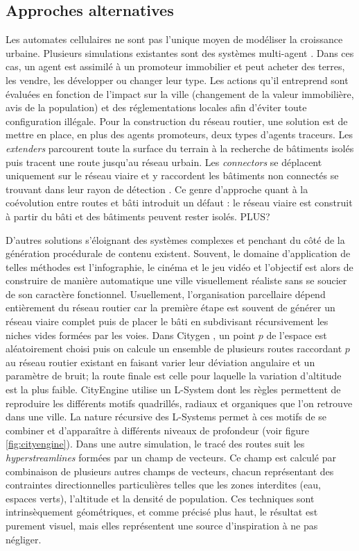 \documentclass[12pt]{article}
\begin{document}
\subsection{Approches alternatives}

Les automates cellulaires ne sont pas l'unique moyen de modéliser la
croissance urbaine. Plusieurs simulations existantes sont des systèmes
multi-agent \cite{Lechner2003,Lechner2004}. Dans ces cas, un agent est
assimilé à un promoteur immobilier et peut acheter des terres, les
vendre, les développer ou changer leur type. Les actions qu'il
entreprend sont évaluées en fonction de l'impact sur la ville
(changement de la valeur immobilière, avis de la population) et des
réglementations locales afin d'éviter toute configuration illégale.
Pour la construction du réseau routier, une solution est de mettre en
place, en plus des agents promoteurs, deux types d'agents
traceurs. Les \textit{extenders} parcourent toute la surface du
terrain à la recherche de bâtiments isolés puis tracent une route
jusqu'au réseau urbain. Les \textit{connectors} se déplacent
uniquement sur le réseau viaire et y raccordent les bâtiments non
connectés se trouvant dans leur rayon de détection
\cite{Lechner2003}. Ce genre d'approche quant à la coévolution entre
routes et bâti introduit un défaut : le réseau viaire est construit à
partir du bâti et des bâtiments peuvent rester isolés. PLUS?

D'autres solutions s'éloignant des systèmes complexes et penchant du
côté de la génération procédurale de contenu existent. Souvent, le
domaine d'application de telles méthodes est l'infographie, le cinéma
et le jeu vidéo et l'objectif est alors de construire de manière
automatique une ville visuellement réaliste sans se soucier de son
caractère fonctionnel. Usuellement, l'organisation parcellaire dépend
entièrement du réseau routier car la première étape est souvent de
générer un réseau viaire complet puis de placer le bâti en subdivisant
récursivement les niches vides formées par les voies. Dans Citygen
\cite{Kelly2006b}, un point $p$ de l'espace est aléatoirement choisi
puis on calcule un ensemble de plusieurs routes raccordant $p$ au
réseau routier existant en faisant varier leur déviation angulaire et
un paramètre de bruit; la route finale est celle pour laquelle la
variation d'altitude est la plus faible. CityEngine \cite{Parish2001}
utilise un L-System dont les règles permettent de reproduire les
différents motifs quadrillés, radiaux et organiques que l'on retrouve
dans une ville. La nature récursive des L-Systems permet à ces motifs
de se combiner et d'apparaître à différents niveaux de profondeur
(voir figure \ref{fig:cityengine}). Dans une autre simulation, le
tracé des routes suit les \textit{hyperstreamlines} \cite{Chen2008}
formées par un champ de vecteurs. Ce champ est calculé par combinaison
de plusieurs autres champs de vecteurs, chacun représentant des
contraintes directionnelles particulières telles que les zones
interdites (eau, espaces verts), l'altitude et la densité de
population. Ces techniques sont intrinsèquement géométriques, et comme
précisé plus haut, le résultat est purement visuel, mais elles
représentent une source d'inspiration à ne pas négliger.
\end{document}
